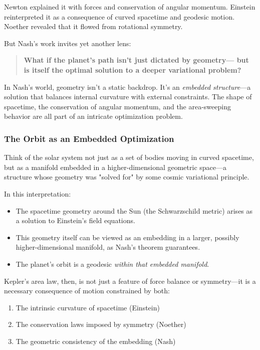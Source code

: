 Newton explained it with forces and conservation of angular momentum.  
Einstein reinterpreted it as a consequence of curved spacetime and geodesic motion.  
Noether revealed that it flowed from rotational symmetry.

But Nash’s work invites yet another lens:

\begin{quote}
\textbf{What if the planet’s path isn’t just dictated by geometry—  
but is itself the optimal solution to a deeper variational problem?}
\end{quote}

In Nash’s world, geometry isn’t a static backdrop.  
It’s an \textit{embedded structure}—a solution that balances internal curvature with external constraints.  
The shape of spacetime, the conservation of angular momentum, and the area-sweeping behavior are all part of an intricate optimization problem.

\subsubsection*{The Orbit as an Embedded Optimization}

Think of the solar system not just as a set of bodies moving in curved spacetime,  
but as a manifold embedded in a higher-dimensional geometric space—a structure whose geometry was "solved for" by some cosmic variational principle.

In this interpretation:

\begin{itemize}
  \item The spacetime geometry around the Sun (the Schwarzschild metric) arises as a solution to Einstein’s field equations.
  \item This geometry itself can be viewed as an embedding in a larger, possibly higher-dimensional manifold, as Nash’s theorem guarantees.
  \item The planet’s orbit is a geodesic \emph{within that embedded manifold}.
\end{itemize}

Kepler’s area law, then, is not just a feature of force balance or symmetry—it is a necessary consequence of motion constrained by both:

\begin{enumerate}
  \item The intrinsic curvature of spacetime (Einstein)
  \item The conservation laws imposed by symmetry (Noether)
  \item The geometric consistency of the embedding (Nash)
\end{enumerate}

